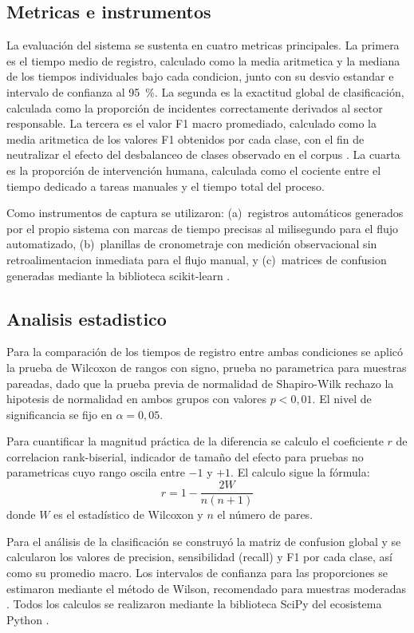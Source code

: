 \subsection{Metricas e instrumentos}

La evaluación del sistema se sustenta en cuatro metricas principales. La primera es el tiempo medio de registro, calculado como la media aritmetica y la mediana de los tiempos individuales bajo cada condicion, junto con su desvio estandar e intervalo de confianza al 95~\%. La segunda es la exactitud global de clasificación, calculada como la proporción de incidentes correctamente derivados al sector responsable. La tercera es el valor F1 macro promediado, calculado como la media aritmetica de los valores F1 obtenidos por cada clase, con el fin de neutralizar el efecto del desbalanceo de clases observado en el corpus \parencite{Sokolova2009_performance_measures}. La cuarta es la proporción de intervención humana, calculada como el cociente entre el tiempo dedicado a tareas manuales y el tiempo total del proceso.

Como instrumentos de captura se utilizaron: (a)~registros automáticos generados por el propio sistema con marcas de tiempo precisas al milisegundo para el flujo automatizado, (b)~planillas de cronometraje con medición observacional sin retroalimentacion inmediata para el flujo manual, y (c)~matrices de confusion generadas mediante la biblioteca scikit-learn \parencite{Pedregosa2011_scikit_learn}.

\subsection{Analisis estadistico}

Para la comparación de los tiempos de registro entre ambas condiciones se aplicó la prueba de Wilcoxon de rangos con signo, prueba no parametrica para muestras pareadas, dado que la prueba previa de normalidad de Shapiro-Wilk rechazo la hipotesis de normalidad en ambos grupos con valores \(p < 0{,}01\). El nivel de significancia se fijo en \(\alpha = 0{,}05\).

Para cuantificar la magnitud práctica de la diferencia se calculo el coeficiente \(r\) de correlacion rank-biserial, indicador de tamaño del efecto para pruebas no parametricas cuyo rango oscila entre \(-1\) y \(+1\). El calculo sigue la fórmula:
\[
r = 1 - \frac{2W}{n(n+1)}
\]
donde \(W\) es el estadístico de Wilcoxon y \(n\) el número de pares.

Para el análisis de la clasificación se construyó la matriz de confusion global y se calcularon los valores de precision, sensibilidad (recall) y F1 por cada clase, así como su promedio macro. Los intervalos de confianza para las proporciones se estimaron mediante el método de Wilson, recomendado para muestras moderadas \parencite{Wilson1927_probable_inference}. Todos los calculos se realizaron mediante la biblioteca SciPy del ecosistema Python \parencite{Virtanen2020_scipy}.

